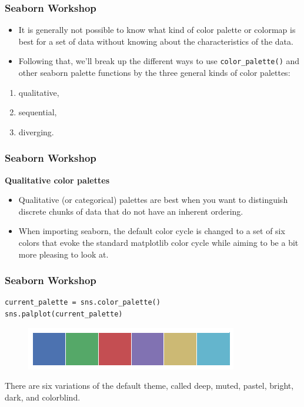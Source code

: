 \documentclass{beamer}
\begin{document}
\begin{frame}[fragile]
	\frametitle{Seaborn Workshop}
	\Large
\begin{itemize}
\item It is generally not possible to know what kind of color palette or colormap is best for a set of data without knowing about the characteristics of the data.
\item Following that, we’ll break up the different ways to use \texttt{color\_palette()} and other seaborn palette functions by the three general kinds of color palettes:
\end{itemize}
{ \Large \begin{enumerate}
\item qualitative, 
\item sequential, 
\item diverging.
\end{enumerate}
}

\end{frame}
\begin{frame}[fragile]
\frametitle{Seaborn Workshop}
\large
\noindent \textbf{Qualitative color palettes}\\
\begin{itemize}
\item Qualitative (or categorical) palettes are best when you want to distinguish discrete chunks of data that do not have an inherent ordering.

\item When importing seaborn, the default color cycle is changed to a set of six colors that evoke the standard matplotlib color cycle while aiming to be a bit more pleasing to look at.
\end{itemize}

\end{frame}
\begin{frame}[fragile]
	\frametitle{Seaborn Workshop}
	\large
\begin{verbatim}
current_palette = sns.color_palette()
sns.palplot(current_palette)
\end{verbatim}
\begin{figure}
\centering
\includegraphics[width=0.7\linewidth]{images/color_palettes_8_0}
\end{figure}

There are six variations of the default theme, called deep, muted, pastel, bright, dark, and colorblind.
\end{frame}
\end{document}
